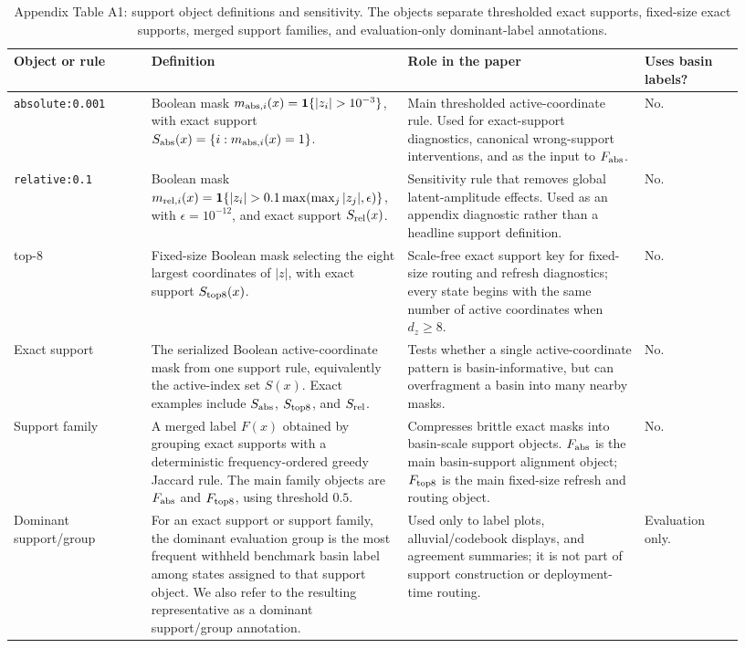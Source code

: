 \begin{table}[tbp]
\centering
\small
\caption{Appendix Table A1: support object definitions and sensitivity. The
objects separate thresholded exact supports, fixed-size exact supports, merged
support families, and evaluation-only dominant-label annotations.}
\label{tab:support_object_definitions_sensitivity}
\begin{tabular}{p{0.18\linewidth}p{0.31\linewidth}p{0.31\linewidth}p{0.13\linewidth}}
\toprule
Object or rule & Definition & Role in the paper & Uses basin labels? \\
\midrule
\texttt{absolute:0.001} & Boolean mask
\(m_{{\rm abs},i}(x)=\mathbf{1}\{|z_i|>10^{-3}\}\), with exact support
\(S_{\rm abs}(x)=\{i:m_{{\rm abs},i}(x)=1\}\). & Main thresholded active-coordinate
rule. Used for exact-support diagnostics, canonical wrong-support
interventions, and as the input to \(F_{\rm abs}\). & No. \\
\addlinespace
\texttt{relative:0.1} & Boolean mask
\(m_{{\rm rel},i}(x)=\mathbf{1}\{|z_i|>0.1\max(\max_j |z_j|,\epsilon)\}\),
with \(\epsilon=10^{-12}\), and exact support \(S_{\rm rel}(x)\). & Sensitivity
rule that removes global latent-amplitude effects. Used as an appendix
diagnostic rather than a headline support definition. & No. \\
\addlinespace
top-\(8\) & Fixed-size Boolean mask selecting the eight largest coordinates of
\(|z|\), with exact support \(S_{\rm top8}(x)\). & Scale-free exact support
key for fixed-size routing and refresh diagnostics; every state begins with
the same number of active coordinates when \(d_z\ge 8\). & No. \\
\addlinespace
Exact support & The serialized Boolean active-coordinate mask from one support
rule, equivalently the active-index set \(S(x)\). Exact examples include
\(S_{\rm abs}\), \(S_{\rm top8}\), and \(S_{\rm rel}\). & Tests whether a
single active-coordinate pattern is basin-informative, but can overfragment a
basin into many nearby masks. & No. \\
\addlinespace
Support family & A merged label \(F(x)\) obtained by grouping exact supports
with a deterministic frequency-ordered greedy Jaccard rule. The main family
objects are \(F_{\rm abs}\) and \(F_{\rm top8}\), using threshold \(0.5\). &
Compresses brittle exact masks into basin-scale support objects. \(F_{\rm abs}\)
is the main basin-support alignment object; \(F_{\rm top8}\) is the main
fixed-size refresh and routing object. & No. \\
\addlinespace
Dominant support/group & For an exact support or support family, the dominant
evaluation group is the most frequent withheld benchmark basin label among
states assigned to that support object. We also refer to the resulting
representative as a dominant support/group annotation. & Used only to label
plots, alluvial/codebook displays, and agreement summaries; it is not part of
support construction or deployment-time routing. & Evaluation only. \\
\bottomrule
\end{tabular}
\end{table}
